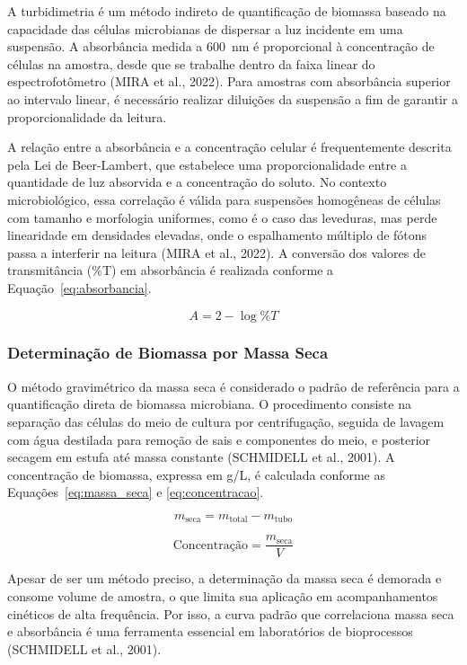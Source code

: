 A turbidimetria é um método indireto de quantificação de biomassa baseado na capacidade das células microbianas de dispersar a luz incidente em uma suspensão. A absorbância medida a 600~nm é proporcional à concentração de células na amostra, desde que se trabalhe dentro da faixa linear do espectrofotômetro (MIRA et al., 2022). Para amostras com absorbância superior ao intervalo linear, é necessário realizar diluições da suspensão a fim de garantir a proporcionalidade da leitura.

A relação entre a absorbância e a concentração celular é frequentemente descrita pela Lei de Beer-Lambert, que estabelece uma proporcionalidade entre a quantidade de luz absorvida e a concentração do soluto. No contexto microbiológico, essa correlação é válida para suspensões homogêneas de células com tamanho e morfologia uniformes, como é o caso das leveduras, mas perde linearidade em densidades elevadas, onde o espalhamento múltiplo de fótons passa a interferir na leitura (MIRA et al., 2022). A conversão dos valores de transmitância (\%T) em absorbância é realizada conforme a Equação~\ref{eq:absorbancia}.

\begin{equation}
    A = 2 - \log \%T
    \label{eq:absorbancia}
\end{equation}

\subsubsection{Determinação de Biomassa por Massa Seca}

O método gravimétrico da massa seca é considerado o padrão de referência para a quantificação direta de biomassa microbiana. O procedimento consiste na separação das células do meio de cultura por centrifugação, seguida de lavagem com água destilada para remoção de sais e componentes do meio, e posterior secagem em estufa até massa constante (SCHMIDELL et al., 2001). A concentração de biomassa, expressa em g/L, é calculada conforme as Equações~\ref{eq:massa_seca} e \ref{eq:concentracao}.

\begin{equation}
    m_{\text{seca}} = m_{\text{total}} - m_{\text{tubo}}
    \label{eq:massa_seca}
\end{equation}

\begin{equation}
    \text{Concentração} = \frac{m_{\text{seca}}}{V}
    \label{eq:concentracao}
\end{equation}

Apesar de ser um método preciso, a determinação da massa seca é demorada e consome volume de amostra, o que limita sua aplicação em acompanhamentos cinéticos de alta frequência. Por isso, a curva padrão que correlaciona massa seca e absorbância é uma ferramenta essencial em laboratórios de bioprocessos (SCHMIDELL et al., 2001).
